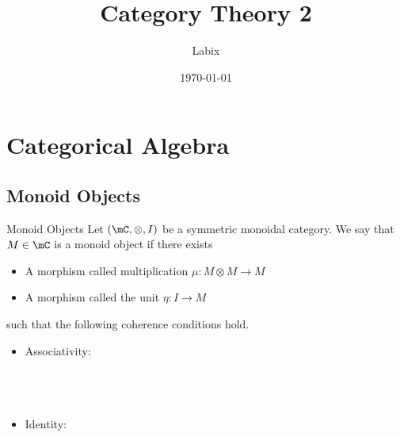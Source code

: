 \documentclass[a4paper]{article}
\title{Category Theory 2}
\author{Labix}
\date{\today}
\begin{document}
\maketitle
\begin{abstract}
\end{abstract}
\pagebreak
\tableofcontents

\pagebreak
\section{Categorical Algebra}
\subsection{Monoid Objects}
\begin{defn}{Monoid Objects}{} Let $(\mC,\otimes,I)$ be a symmetric monoidal category. We say that $M\in\mC$ is a monoid object if there exists
\begin{itemize}
\item A morphism called multiplication $\mu:M\otimes M\to M$
\item A morphism called the unit $\eta:I\to M$
\end{itemize}
such that the following coherence conditions hold. 
\begin{itemize}
\item Associativity: \\~\\
\\~\\
\item Identity: \\~\\
\\~\\
\end{itemize}
\end{defn}
\end{document}
